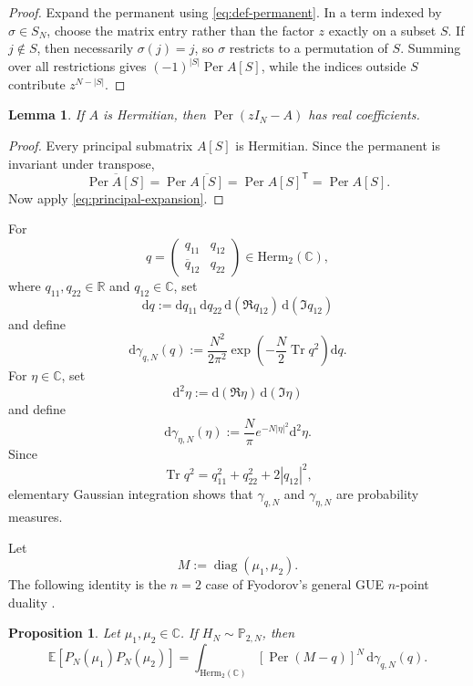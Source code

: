 \documentclass[11pt,reqno]{amsart}
\numberwithin{equation}{section}
\newtheorem{proposition}[theorem]{Proposition}
\newtheorem{lemma}[theorem]{Lemma}
\theoremstyle{definition}
\theoremstyle{remark}
\DeclareMathOperator{\Per}{Per}
\DeclareMathOperator{\Tr}{Tr}
\DeclareMathOperator{\diag}{diag}
\newcommand{\E}{\mathbb E}
\newcommand{\Pp}{\mathbb P}
\newcommand{\R}{\mathbb R}
\newcommand{\C}{\mathbb C}
\newcommand{\1}{\mathbf 1}
\newcommand{\dd}{\mathrm d}
\newcommand{\Herm}{\mathrm{Herm}}
\begin{document}
\begin{proof}
Expand the permanent using \eqref{eq:def-permanent}.  In a term indexed by
\(\sigma\in S_N\), choose the matrix entry rather than the factor \(z\)
exactly on a subset \(S\).  If \(j\notin S\), then necessarily
\(\sigma(j)=j\), so \(\sigma\) restricts to a permutation of \(S\).  Summing
over all restrictions gives \((-1)^{|S|}\Per A[S]\), while the indices
outside \(S\) contribute \(z^{N-|S|}\).
\end{proof}

\begin{lemma}\label{lem:real-coefficients}
If \(A\) is Hermitian, then \(\Per(zI_N-A)\) has real coefficients.
\end{lemma}

\begin{proof}
Every principal submatrix \(A[S]\) is Hermitian.  Since the permanent is
invariant under transpose,
\[
  \overline{\Per A[S]}
  =
  \Per\overline{A[S]}
  =
  \Per A[S]^{\mathsf T}
  =
  \Per A[S].
\]
Now apply \eqref{eq:principal-expansion}.
\end{proof}

For
\[
  q=
  \begin{pmatrix}
    q_{11}&q_{12}\\
    \overline q_{12}&q_{22}
  \end{pmatrix}
  \in\Herm_2(\C),
\]
where \(q_{11},q_{22}\in\R\) and \(q_{12}\in\C\), set
\[
  \dd q
  :=
  \dd q_{11}\,\dd q_{22}\,
  \dd(\Re q_{12})\,\dd(\Im q_{12})
\]
and define
\begin{equation}\label{eq:aux-q-law}
  \dd\gamma_{q,N}(q)
  :=
  \frac{N^2}{2\pi^2}
  \exp\!\left(-\frac N2\Tr q^2\right)\dd q.
\end{equation}
For \(\eta\in\C\), set
\[
  \dd^2\eta:=\dd(\Re\eta)\,\dd(\Im\eta)
\]
and define
\begin{equation}\label{eq:eta-law}
  \dd\gamma_{\eta,N}(\eta)
  :=
  \frac N\pi e^{-N|\eta|^2}\dd^2\eta.
\end{equation}
Since
\[
  \Tr q^2=q_{11}^2+q_{22}^2+2|q_{12}|^2,
\]
elementary Gaussian integration shows that \(\gamma_{q,N}\) and
\(\gamma_{\eta,N}\) are probability measures.

Let
\[
  M:=\diag(\mu_1,\mu_2).
\]
The following identity is the \(n=2\) case of Fyodorov's general GUE
\(n\)-point duality \cite[Theorem~1.2 and Eq.~(4.17)]{Fyodorov2006}.

\begin{proposition} 
Let \(\mu_1,\mu_2\in\C\).  If \(H_N\sim\Pp_{2,N}\), then
\begin{equation}\label{eq:GUE-per-duality}
  \E[P_N(\mu_1)P_N(\mu_2)]
  =
  \int_{\Herm_2(\C)}
  [\Per(M-q)]^N\,\dd\gamma_{q,N}(q).
\end{equation}
\end{proposition}
\end{document}
